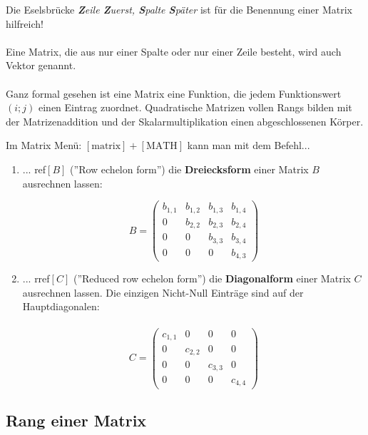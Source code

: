 \documentclass[main.tex]{subfiles}
\begin{document}
\begin{Bemerkung}
    Die Eselsbrücke \textit{\textbf{Z}eile \textbf{Z}uerst, \textbf{S}palte \textbf{S}päter} ist für die Benennung einer Matrix hilfreich!\\\\
    Eine Matrix, die aus nur einer Spalte oder nur einer Zeile besteht, wird auch Vektor genannt.\\\\
    Ganz formal gesehen ist eine Matrix eine Funktion, die jedem Funktionswert $(i;j)$ einen Eintrag zuordnet. Quadratische Matrizen vollen Rangs bilden mit der Matrizenaddition und der Skalarmultiplikation einen abgeschlossenen Körper.
\end{Bemerkung}


\begin{GTR-Tipp}
    Im Matrix Menü: $[\text{matrix}] + [\text{MATH}]$ kann man mit dem Befehl...\\
    \begin{enumerate}
        \item ... ref$[B]$ (''Row echelon form'') die \textbf{Dreiecksform} einer Matrix $B$ ausrechnen lassen:
        
            $$B= \begin{pmatrix}
                b_{1,1}&b_{1,2}&b_{1,3}&b_{1,4}\\
                0&b_{2,2}&b_{2,3}&b_{2,4}\\
                0&0&b_{3,3}&b_{3,4}\\
                0&0&0&b_{4,3}
            \end{pmatrix}$$
        \item ... rref$[C]$ (''Reduced row echelon form'') die \textbf{Diagonalform} einer Matrix $C$ ausrechnen lassen. Die einzigen Nicht-Null Einträge sind auf der Hauptdiagonalen:\\\\
            $$C= \begin{pmatrix}
                c_{1,1}&0&0&0\\
                0&c_{2,2}&0&0\\
                0&0&c_{3,3}&0\\
                0&0&0&c_{4,4}
            \end{pmatrix}$$
    \end{enumerate}
\end{GTR-Tipp}


\subsection{Rang einer Matrix}
\end{document}
